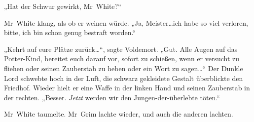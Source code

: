 „Hat der Schwur gewirkt, Mr~White?“

Mr~White klang, als ob er weinen würde.
„Ja, Meister…ich habe so viel verloren, bitte, ich bin schon genug bestraft worden.“

„Kehrt auf eure Plätze zurück…“, sagte Voldemort.
„Gut. Alle Augen auf das Potter-Kind, bereitet euch darauf vor, sofort zu schießen, wenn er versucht zu fliehen oder seinen Zauberstab zu heben oder ein Wort zu sagen…“
Der Dunkle Lord schwebte hoch in der Luft, die schwarz gekleidete Gestalt überblickte den Friedhof. Wieder hielt er eine Waffe in der linken Hand und seinen Zauberstab in der rechten.
„Besser. \emph{Jetzt} werden wir den Jungen-der-überlebte töten.“

Mr~White taumelte. Mr~Grim lachte wieder, und auch die anderen lachten.

